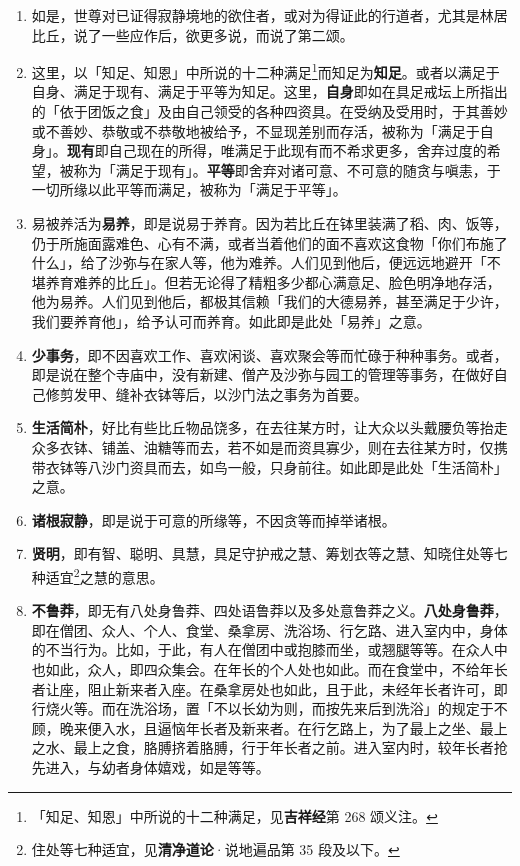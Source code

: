 \begin{enumerate}\item 如是，世尊对已证得寂静境地的欲住者，或对为得证此的行道者，尤其是林居比丘，说了一些应作后，欲更多说，而说了第二颂。
\item 这里，以「知足、知恩」中所说的十二种满足\footnote{「知足、知恩」中所说的十二种满足，见\textbf{吉祥经}第 268 颂义注。}而知足为\textbf{知足}。或者以满足于自身、满足于现有、满足于平等为知足。这里，\textbf{自身}即如在具足戒坛上所指出的「依于团饭之食」及由自己领受的各种四资具。在受纳及受用时，于其善妙或不善妙、恭敬或不恭敬地被给予，不显现差别而存活，被称为「满足于自身」。\textbf{现有}即自己现在的所得，唯满足于此现有而不希求更多，舍弃过度的希望，被称为「满足于现有」。\textbf{平等}即舍弃对诸可意、不可意的随贪与嗔恚，于一切所缘以此平等而满足，被称为「满足于平等」。
\item 易被养活为\textbf{易养}，即是说易于养育。因为若比丘在钵里装满了稻、肉、饭等，仍于所施面露难色、心有不满，或者当着他们的面不喜欢这食物「你们布施了什么」，给了沙弥与在家人等，他为难养。人们见到他后，便远远地避开「不堪养育难养的比丘」。但若无论得了精粗多少都心满意足、脸色明净地存活，他为易养。人们见到他后，都极其信赖「我们的大德易养，甚至满足于少许，我们要养育他」，给予认可而养育。如此即是此处「易养」之意。
\item \textbf{少事务}，即不因喜欢工作、喜欢闲谈、喜欢聚会等而忙碌于种种事务。或者，即是说在整个寺庙中，没有新建、僧产及沙弥与园工的管理等事务，在做好自己修剪发甲、缝补衣钵等后，以沙门法之事务为首要。
\item \textbf{生活简朴}，好比有些比丘物品饶多，在去往某方时，让大众以头戴腰负等抬走众多衣钵、铺盖、油糖等而去，若不如是而资具寡少，则在去往某方时，仅携带衣钵等八沙门资具而去，如鸟一般，只身前往。如此即是此处「生活简朴」之意。
\item \textbf{诸根寂静}，即是说于可意的所缘等，不因贪等而掉举诸根。
\item \textbf{贤明}，即有智、聪明、具慧，具足守护戒之慧、筹划衣等之慧、知晓住处等七种适宜\footnote{住处等七种适宜，见\textbf{清净道论}·说地遍品第 35 段及以下。}之慧的意思。
\item \textbf{不鲁莽}，即无有八处身鲁莽、四处语鲁莽以及多处意鲁莽之义。\textbf{八处身鲁莽}，即在僧团、众人、个人、食堂、桑拿房、洗浴场、行乞路、进入室内中，身体的不当行为。比如，于此，有人在僧团中或抱膝而坐，或翘腿等等。在众人中也如此，众人，即四众集会。在年长的个人处也如此。而在食堂中，不给年长者让座，阻止新来者入座。在桑拿房处也如此，且于此，未经年长者许可，即行烧火等。而在洗浴场，置「不以长幼为则，而按先来后到洗浴」的规定于不顾，晚来便入水，且逼恼年长者及新来者。在行乞路上，为了最上之坐、最上之水、最上之食，胳膊挤着胳膊，行于年长者之前。进入室内时，较年长者抢先进入，与幼者身体嬉戏，如是等等。

\end{enumerate}

